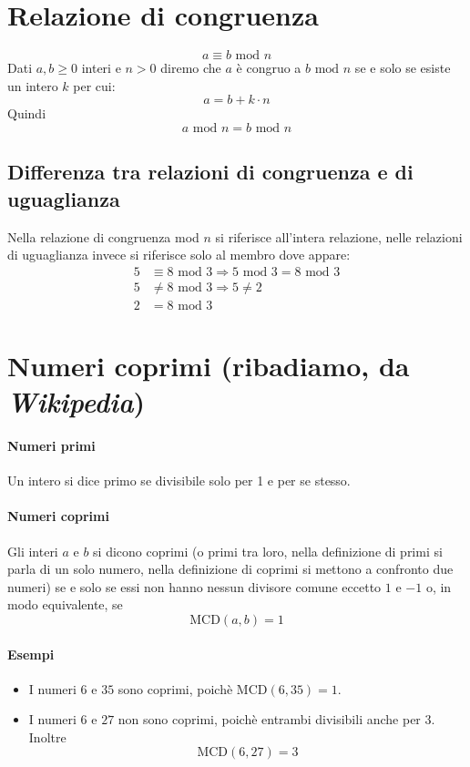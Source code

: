 \section{Relazione di congruenza} 
$$ a \equiv b \text{ mod } n $$Dati $a, b \geq 0$ interi e $n > 0$ diremo che $a$ è congruo a $b \text{ mod } n$ se e solo se esiste un intero $k$ per cui:
$$ a = b + k \cdot n $$
Quindi
$$ a \text{ mod } n = b \text{ mod } n $$
\subsection{Differenza tra relazioni di congruenza e di uguaglianza}
Nella relazione di congruenza mod $n$ si riferisce all'intera relazione, nelle relazioni di uguaglianza invece si riferisce solo al membro dove appare:
\begin{align*}
	5&\equiv 8\text{ mod }3 \Longrightarrow 5 \text{ mod } 3 = 8 \text{ mod } 3\\
	5 &\neq 8 \text{ mod } 3 \Longrightarrow 5 \neq 2\\
	2&=8 \text{ mod }3
\end{align*}

\section{Numeri coprimi (ribadiamo, da \textit{Wikipedia})}
\paragraph{Numeri primi} Un intero si dice primo se divisibile solo per 1 e per se stesso. 
\paragraph{Numeri coprimi} Gli interi $a$ e $b$ si dicono coprimi (o primi tra loro, nella definizione di primi si parla di un solo numero, nella definizione di coprimi si mettono a confronto due numeri) se e solo se
essi non hanno nessun divisore comune eccetto $1$ e $-1$ o, in modo equivalente, se 
$$\text{MCD}(a,b)=1$$
\paragraph{Esempi}
\begin{itemize}
	\item I numeri $6$ e $35$ sono coprimi, poichè $\text{MCD}(6,35)=1$.
	\item I numeri $6$ e $27$ non sono coprimi, poichè entrambi divisibili anche per $3$. Inoltre
	$$\text{MCD}(6,27)=3$$
\end{itemize}


